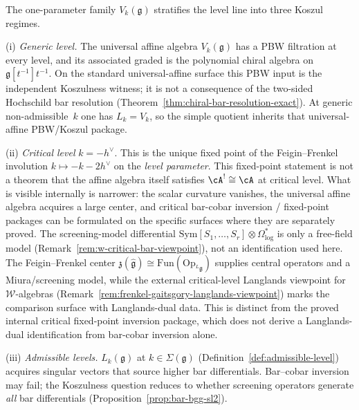 \begin{remark}
\label{rem:moduli-koszul-parameters}
The one-parameter family $V_k(\mathfrak{g})$ stratifies the
level line into three Koszul regimes.

\textup{(i)}
\emph{Generic level.}
The universal affine algebra $V_k(\mathfrak{g})$ has a PBW
filtration at every level, and its associated graded is the
polynomial chiral algebra on $\mathfrak g[t^{-1}]t^{-1}$.  On the
standard universal-affine surface this PBW input is the independent
Koszulness witness; it is not a consequence of the two-sided
Hochschild bar resolution
(Theorem~\ref{thm:chiral-bar-resolution-exact}).  At generic
non-admissible~$k$ one has $L_k=V_k$, so the simple quotient inherits
that universal-affine PBW/Koszul package.

\textup{(ii)}
\emph{Critical level} $k = -h^\vee$.
This is the unique fixed point of the Feigin--Frenkel
involution $k \mapsto -k - 2h^\vee$ on the \emph{level parameter}.
This fixed-point statement is not a theorem that the affine algebra
itself satisfies $\cA^! \cong \cA$ at critical level.
What is visible internally is narrower: the scalar curvature vanishes,
the universal affine algebra acquires a large center, and critical
bar-cobar inversion / fixed-point packages can be formulated on the
specific surfaces where they are separately proved. The screening-model
differential
$\mathrm{Sym}[S_1, \ldots, S_r] \otimes \Omega^*_{\log}$
is only a free-field model
\textup{(}Remark~\ref{rem:w-critical-bar-viewpoint}\textup{)},
not an identification used here.
The Feigin--Frenkel center
$\mathfrak{z}(\widehat{\mathfrak{g}}) \cong
\mathrm{Fun}(\mathrm{Op}_{{}^L\!\mathfrak{g}})$
supplies central operators and a Miura/screening model, while the
external critical-level Langlands viewpoint for $\mathcal W$-algebras
\textup{(}Remark~\ref{rem:frenkel-gaitsgory-langlands-viewpoint}\textup{)}
marks the comparison surface with Langlands-dual data.
This is distinct from the proved internal critical fixed-point
inversion package, which does not derive a Langlands-dual
identification from bar-cobar inversion alone.

\textup{(iii)}
\emph{Admissible levels.}
$L_k(\mathfrak{g})$ at $k \in \Sigma(\mathfrak{g})$
(Definition~\ref{def:admissible-level}) acquires singular
vectors that source higher bar differentials. Bar--cobar
inversion may fail; the Koszulness question reduces to whether
screening operators generate \emph{all} bar differentials
(Proposition~\ref{prop:bar-bgg-sl2}).
\end{remark}

